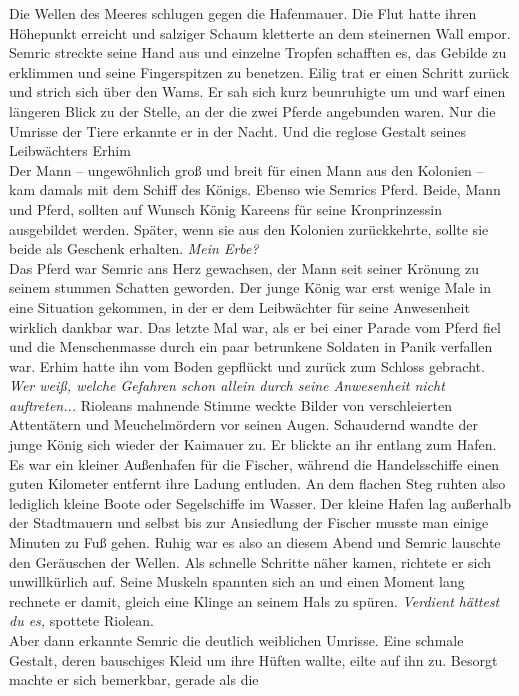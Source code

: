 Die Wellen des Meeres schlugen gegen die Hafenmauer. Die Flut hatte ihren Höhepunkt erreicht und 
salziger Schaum kletterte an dem steinernen Wall empor. Semric streckte seine Hand aus und 
einzelne Tropfen schafften es, das Gebilde zu erklimmen und seine Fingerspitzen zu benetzen. 
Eilig trat er einen Schritt zurück und strich sich über den Wams. Er sah sich kurz beunruhigte um 
und warf einen längeren Blick zu der Stelle, an der die zwei Pferde angebunden waren. Nur die 
Umrisse der Tiere erkannte er in der Nacht. Und die reglose Gestalt seines Leibwächters Erhim \\ 
Der Mann – ungewöhnlich groß und breit für einen Mann aus den Kolonien – kam
damals mit dem Schiff des Königs. Ebenso wie Semrics Pferd. Beide, Mann und Pferd, sollten auf 
Wunsch König Kareens für seine Kronprinzessin ausgebildet werden. Später, wenn sie aus den Kolonien 
zurückkehrte, sollte sie beide als Geschenk erhalten. \textit{Mein Erbe?}\\
Das Pferd war Semric ans Herz gewachsen, der Mann seit seiner Krönung zu seinem stummen Schatten 
geworden. Der junge König war erst wenige Male in eine Situation gekommen, in der er dem 
Leibwächter für seine Anwesenheit wirklich dankbar war. Das letzte Mal war, als er bei einer Parade 
vom Pferd fiel und die Menschenmasse durch ein paar betrunkene Soldaten in Panik verfallen war. 
Erhim hatte ihn vom Boden gepflückt und zurück zum Schloss gebracht. \textit{Wer weiß, welche 
Gefahren schon allein durch seine Anwesenheit nicht auftreten...} Rioleans mahnende Stimme weckte 
Bilder von verschleierten Attentätern und Meuchelmördern vor seinen Augen. Schaudernd wandte der 
junge König sich wieder der Kaimauer zu. Er blickte an ihr entlang zum Hafen. Es war ein kleiner 
Außenhafen für die Fischer, während die Handelsschiffe einen guten Kilometer entfernt ihre Ladung 
entluden. An dem flachen Steg ruhten also lediglich kleine Boote oder Segelschiffe im Wasser. Der 
kleine Hafen lag außerhalb der Stadtmauern und selbst bis zur Ansiedlung der Fischer musste man 
einige Minuten zu Fuß gehen. Ruhig war es also an diesem Abend und Semric lauschte den Geräuschen 
der Wellen. Als schnelle Schritte näher kamen, richtete er sich unwillkürlich auf. Seine Muskeln 
spannten sich an und einen Moment lang rechnete er damit, gleich eine Klinge an seinem Hals zu 
spüren. \textit{Verdient hättest du es,} spottete Riolean.\\
Aber dann erkannte Semric die deutlich weiblichen Umrisse. Eine schmale Gestalt, deren bauschiges 
Kleid um ihre Hüften wallte, eilte auf ihn zu. Besorgt machte er sich bemerkbar, gerade als die 
